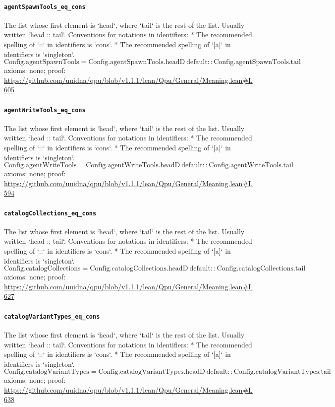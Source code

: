 \documentclass[11pt]{article}
\begin{document}
\paragraph{\texttt{agentSpawnTools\_eq\_cons}}
The list whose first element is `head`, where `tail` is the rest of the list. Usually written `head :: tail`.   Conventions for notations in identifiers:   * The recommended spelling of `::` in identifiers is `cons`.   * The recommended spelling of `[a]` in identifiers is `singleton`.
\[ \mathrm{Config.agentSpawnTools} = \mathrm{Config.agentSpawnTools.headD}\ \mathrm{default} :: \mathrm{Config.agentSpawnTools.tail} \]
\noindent axioms: none; proof: \url{https://github.com/uuidna/qpu/blob/v1.1.1/lean/Qpu/General/Meaning.lean\#L605}

\paragraph{\texttt{agentWriteTools\_eq\_cons}}
The list whose first element is `head`, where `tail` is the rest of the list. Usually written `head :: tail`.   Conventions for notations in identifiers:   * The recommended spelling of `::` in identifiers is `cons`.   * The recommended spelling of `[a]` in identifiers is `singleton`.
\[ \mathrm{Config.agentWriteTools} = \mathrm{Config.agentWriteTools.headD}\ \mathrm{default} :: \mathrm{Config.agentWriteTools.tail} \]
\noindent axioms: none; proof: \url{https://github.com/uuidna/qpu/blob/v1.1.1/lean/Qpu/General/Meaning.lean\#L594}

\paragraph{\texttt{catalogCollections\_eq\_cons}}
The list whose first element is `head`, where `tail` is the rest of the list. Usually written `head :: tail`.   Conventions for notations in identifiers:   * The recommended spelling of `::` in identifiers is `cons`.   * The recommended spelling of `[a]` in identifiers is `singleton`.
\[ \mathrm{Config.catalogCollections} = \mathrm{Config.catalogCollections.headD}\ \mathrm{default} :: \mathrm{Config.catalogCollections.tail} \]
\noindent axioms: none; proof: \url{https://github.com/uuidna/qpu/blob/v1.1.1/lean/Qpu/General/Meaning.lean\#L627}

\paragraph{\texttt{catalogVariantTypes\_eq\_cons}}
The list whose first element is `head`, where `tail` is the rest of the list. Usually written `head :: tail`.   Conventions for notations in identifiers:   * The recommended spelling of `::` in identifiers is `cons`.   * The recommended spelling of `[a]` in identifiers is `singleton`.
\[ \mathrm{Config.catalogVariantTypes} = \mathrm{Config.catalogVariantTypes.headD}\ \mathrm{default} :: \mathrm{Config.catalogVariantTypes.tail} \]
\noindent axioms: none; proof: \url{https://github.com/uuidna/qpu/blob/v1.1.1/lean/Qpu/General/Meaning.lean\#L638}
\end{document}
